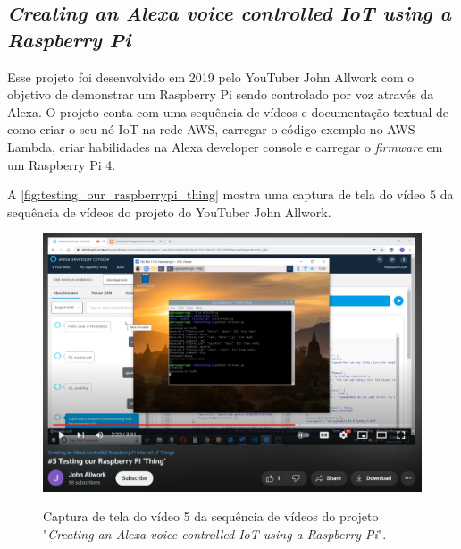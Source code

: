 \subsection{\textit{Creating an Alexa voice controlled IoT using a Raspberry Pi}}\label{subsection:creating_an_alexa_voice_controlled_iot_using_a_raspberry_pi}

Esse projeto foi desenvolvido em 2019 pelo YouTuber John Allwork com o objetivo de demonstrar um Raspberry Pi sendo controlado por voz através da Alexa. O projeto conta com uma sequência de vídeos e documentação textual de como criar o seu nó IoT na rede AWS, carregar o código exemplo no AWS Lambda, criar habilidades na Alexa developer console e carregar o \textit{firmware} em um Raspberry Pi 4.

A \autoref{fig:testing_our_raspberrypi_thing} mostra uma captura de tela do vídeo 5 da sequência de vídeos do projeto do YouTuber John Allwork.

\begin{figure}[htbp]
	\centering
	\caption{Captura de tela do vídeo 5 da sequência de vídeos do projeto "\textit{Creating an Alexa voice controlled IoT using a Raspberry Pi}".}
	\includegraphics[scale=0.75]{Imagens/testing_our_raspberrypi_thing.png}
	\label{fig:testing_our_raspberrypi_thing}
\end{figure}
